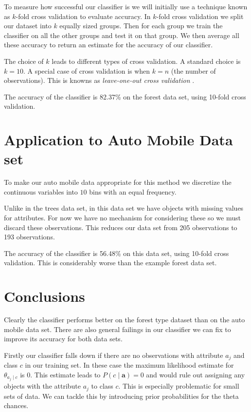 To measure how successful our classifier is we will initially use a technique known as $k$-fold cross validation to evaluate accuracy.
In $k$-fold cross validation we split our dataset into $k$ equally sized groups.
Then for each group we train the classifier on all the other groups and test it on that group.
We then average all these accuracy to return an estimate for the accuracy of our classifier.

The choice of $k$ leads to different types of cross validation.
A standard choice is $k=10$. A special case of cross validation is when $k=n$ (the number of observations).
This is knowns as \textit{leave-one-out cross validation} \cite{Priddy05}.

The accuracy of the classifier is 82.37\% on the forest data set, using 10-fold cross validation.

\section{Application to Auto Mobile Data set}

To make our auto mobile data appropriate for this method we discretize the continuous variables into $10$ bins with an equal frequency.

Unlike in the trees data set, in this data set we have objects with missing values for attributes.
For now we have no mechanism for considering these so we must discard these observations.
This reduces our data set from 205 observations to 193 observations.

The accuracy of the classifier is 56.48\% on this data set, using 10-fold cross validation.
This is considerably worse than the example forest data set.

\section{Conclusions}

Clearly the classifier performs better on the forest type dataset than on the auto mobile data set.
There are also general failings in our classifier we can fix to improve its accuracy for both data sets.

Firstly our classifier falls down if there are no observations with attribute $a_j$ and class $c$ in our training set. In these case the maximum likelihood estimate for $\theta_{a_j \mid c}$ is $0$.
This estimate leads to $P(c \mid \mathbf{a}) = 0$ and would rule out assigning any objects with the attribute $a_j$ to class $c$.
This is especially problematic for small sets of data.
We can tackle this by introducing prior probabilities for the theta chances.

